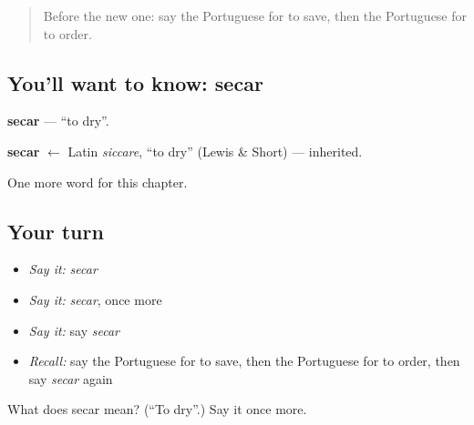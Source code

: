 \begin{quote}
Before the new one: say the Portuguese for to save, then the Portuguese for to order.
\end{quote}

\subsection*{You'll want to know: secar}
\textbf{secar} — \textquotedblleft{}to dry\textquotedblright{}.

\begin{cousinweb}
\textbf{secar} $\leftarrow$ Latin \emph{siccare}, \textquotedblleft{}to dry\textquotedblright{} (Lewis \& Short) — inherited.
\end{cousinweb}

\begin{grammarlens}[title={What you've built}]
One more word for this chapter.
\end{grammarlens}

\subsection*{Your turn}
\begin{itemize}
\raggedright
  \item \emph{Say it:} \emph{secar}
  \item \emph{Say it:} \emph{secar}, once more
  \item \emph{Say it:} say \emph{secar}
  \item \emph{Recall:} say the Portuguese for to save, then the Portuguese for to order, then say \emph{secar} again
\end{itemize}

\begin{tcolorbox}[breakable,colback=teal!4,colframe=teal!35!black,title={Before you move on}]
What does secar mean? (\textquotedblleft{}To dry\textquotedblright{}.) Say it once more.
\end{tcolorbox}
